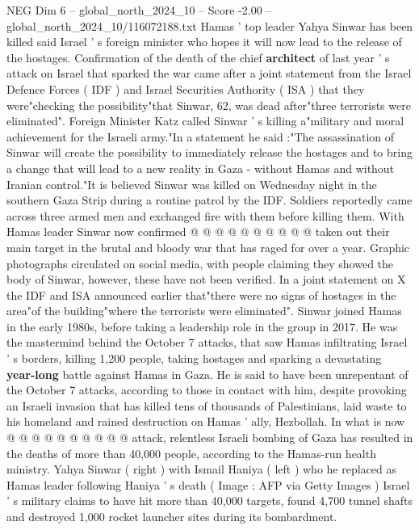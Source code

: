 \begin{textsample}{NEG Dim 6 – global\_north\_2024\_10 – Score -2.00 – global\_north\_2024\_10/116072188.txt}  \label{ex:f6_neg_048}
Hamas ' top leader Yahya Sinwar has been killed said Israel ' s foreign minister who hopes it will now lead to the release of the hostages.
Confirmation of the death of the chief \textbf{architect} of last year ' s attack on Israel that sparked the war came after a joint statement from the Israel Defence Forces ( IDF ) and Israel Securities Authority ( ISA ) that they were"checking the possibility"that Sinwar, 62, was dead after"three terrorists were eliminated".
Foreign Minister Katz called Sinwar ' s killing a"military and moral achievement for the Israeli army."In a statement he said :"The assassination of Sinwar will create the possibility to immediately release the hostages and to bring a change that will lead to a new reality in Gaza - without Hamas and without Iranian control."It is believed Sinwar was killed on Wednesday night in the southern Gaza Strip during a routine patrol by the IDF.
Soldiers reportedly came across three armed men and exchanged fire with them before killing them.
With Hamas leader Sinwar now confirmed @ @ @ @ @ @ @ @ @ @ taken out their main target in the brutal and bloody war that has raged for over a year.
Graphic photographs circulated on social media, with people claiming they showed the body of Sinwar, however, these have not been verified.
In a joint statement on X the IDF and ISA announced earlier that"there were no signs of hostages in the area"of the building"where the terrorists were eliminated".
Sinwar joined Hamas in the early 1980s, before taking a leadership role in the group in 2017.
He was the mastermind behind the October 7 attacks, that saw Hamas infiltrating Israel ' s borders, killing 1,200 people, taking hostages and sparking a devastating \textbf{year-long} battle against Hamas in Gaza.
He is said to have been unrepentant of the October 7 attacks, according to those in contact with him, despite provoking an Israeli invasion that has killed tens of thousands of Palestinians, laid waste to his homeland and rained destruction on Hamas ' ally, Hezbollah.
In what is now @ @ @ @ @ @ @ @ @ @ attack, relentless Israeli bombing of Gaza has resulted in the deaths of more than 40,000 people, according to the Hamas-run health ministry.
Yahya Sinwar ( right ) with Ismail Haniya ( left ) who he replaced as Hamas leader following Haniya ' s death ( Image : AFP via Getty Images ) Israel ' s military claims to have hit more than 40,000 targets, found 4,700 tunnel shafts and destroyed 1,000 rocket launcher sites during its bombardment.

\end{textsample}
